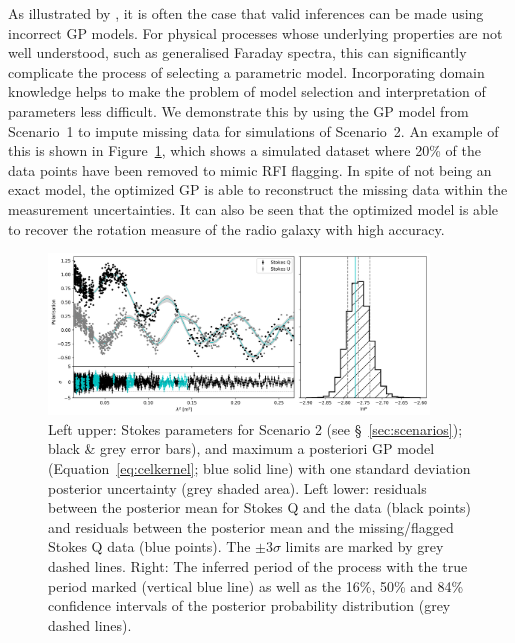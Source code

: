 \documentclass[fleqn,usenatbib]{mnras}
\begin{document}
As illustrated by \cite{celerite}, it is often the case that valid inferences can be made using incorrect GP models. For physical processes whose underlying properties are not well understood, such as generalised Faraday spectra, this can significantly complicate the process of selecting a parametric model. Incorporating domain knowledge helps to make the problem of model selection and interpretation of parameters less difficult. We demonstrate this by using the GP model from Scenario~1 to impute missing data for simulations of Scenario~2. An example of this is shown in Figure~\ref{fig:scenario2}, which shows a simulated dataset where 20\% of the data points have been removed to mimic RFI flagging. In spite of not being an exact model, the optimized GP is able to reconstruct the missing data within the measurement uncertainties. It can also be seen that the optimized model is able to recover the rotation measure of the radio galaxy with high accuracy.
%
\begin{figure}
\includegraphics[width=0.9\textwidth]{./FIGURES/diff_case2_minus30_n0p1.png}
\caption{\label{fig:scenario2} Left upper: Stokes parameters for Scenario 2 (see \S~\ref{sec:scenarios}); black \& grey error bars), and maximum a posteriori GP model (Equation~\ref{eq:celkernel}; blue solid line) with one standard deviation posterior uncertainty (grey shaded area). Left lower: residuals between the posterior mean for Stokes Q and the data (black points) and residuals between the posterior mean and the missing/flagged Stokes Q data (blue points). The $\pm3\sigma$ limits are marked by grey dashed lines. Right: The inferred period of the process with the true period marked (vertical blue line) as well as the 16\%, 50\% and 84\% confidence intervals of the posterior probability distribution (grey dashed lines).}
\end{figure}
\end{document}
